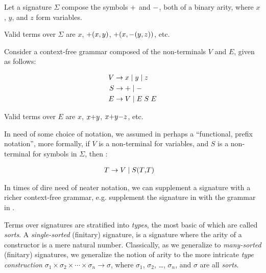 \begin{example} \label{ex:first-signature} Let a signature $\Sigma$ compose the
symbols $\mathtt{+}$ and $\mathtt{-}$, both of a binary arity, where $x$, $y$, and
$z$ form variables.

Valid terms over $\Sigma$ are $x$, $\mathtt{+}\mathopen{}\left({x,y}\right)\mathclose{}$,
$\mathtt{+}\mathopen{}\left({x,\mathtt{-}\mathopen{}\left({y,z}\right)\mathclose{}}\right)\mathclose{}$, etc.  \end{example}

\begin{example} \label{ex:first-grammar} Consider a context-free grammar
composed of the non-terminals $V$ and $E$, given as follows:

\begin{align*}
V &\rightarrow x \mid y \mid z \\
S &\rightarrow \mathtt{+} \mid \mathtt{-} \\
E &\rightarrow V \mid E \; S \; E
\end{align*}

Valid terms over $E$ are $x$, $x \mathtt{+} y$, $x \mathtt{+} y \mathtt{-} z$,
etc. \end{example}

In need of some choice of notation, we assumed in 
perhaps a ``functional, prefix notation'', more formally, if $V$ is a non-terminal for variables, and $S$ is a non-terminal for symbols in $\Sigma$, then :

\begin{align*}
T &\rightarrow V \mid S \mathtt{(} T \mathtt{,} T \mathtt{)}
\end{align*}

In times of dire need of neater notation, we can supplement a signature with a
richer context-free grammar, e.g. supplement the signature in
 with the grammar in .

Terms over signatures are stratified into \emph{types}, the most basic of which
are called \emph{sorts}. A \emph{single-sorted} (finitary) signature, is a
signature where the arity of a constructor is a mere natural number.
Classically, as we generalize to \emph{many-sorted} (finitary) signatures, we
generalize the notion of arity to the more intricate \emph{type construction}
$\sigma_1 \times \sigma_2 \times \cdots \times \sigma_n \rightarrow \sigma$,
where $\sigma_1$, $\sigma_2$, \ldots, $\sigma_n$, and $\sigma$ are all
\emph{sorts}.



